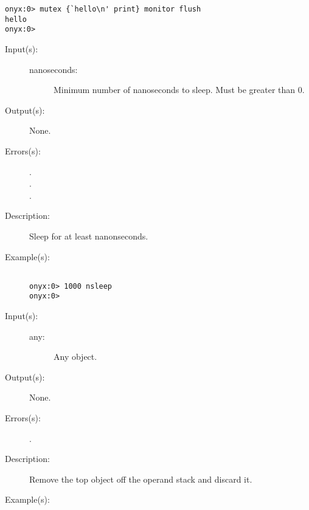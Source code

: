 \begin{description}
\begin{description}
\begin{verbatim}
onyx:0> mutex {`hello\n' print} monitor flush
hello
onyx:0>
		\end{verbatim}
	\end{description}
\label{systemdict:nsleep}
\item[{\onyxop{nanoseconds}{nsleep}{--}}: ]
	\begin{description}\item[]
	\item[Input(s): ]
		\begin{description}\item[]
		\item[nanoseconds: ]
			Minimum number of nanoseconds to sleep.  Must be greater
			than 0.
		\end{description}
	\item[Output(s): ] None.
	\item[Errors(s): ]
		\begin{description}\item[]
		\item[.]
		\item[.]
		\item[.]
		\end{description}
	\item[Description: ]
		Sleep for at least  nanonseconds.
	\item[Example(s): ]\begin{verbatim}

onyx:0> 1000 nsleep
onyx:0>
		\end{verbatim}
	\end{description}
\label{systemdict:pop}
\item[{\onyxop{any}{pop}{--}}: ]
	\begin{description}\item[]
	\item[Input(s): ]
		\begin{description}\item[]
		\item[any: ]
			Any object.
		\end{description}
	\item[Output(s): ] None.
	\item[Errors(s): ]
		\begin{description}\item[]
		\item[.]
		\end{description}
	\item[Description: ]
		Remove the top object off the operand stack and discard it.
	\item[Example(s): ]\begin{verbatim}


\end{verbatim}
\end{description}
\end{description}
